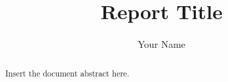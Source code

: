 \documentclass[sigconf]{template/acmart-primary/acmart} %
\title{Report Title}
\author{Your Name}
\affiliation{%
  \institution{Your Institution}
  \city{City}
  \country{Country}
}
\begin{document}
\maketitle

\begin{abstract}
    Insert the document abstract here.
\end{abstract}


\end{document}
